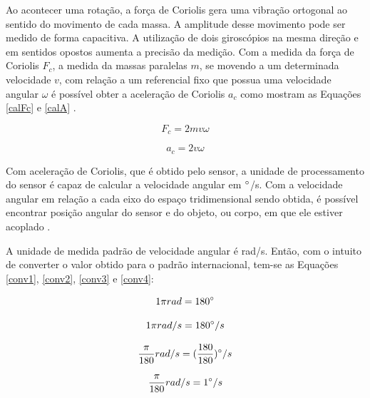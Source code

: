 			Ao acontecer uma rotação, a força de Coriolis gera uma vibração ortogonal ao sentido do movimento de cada massa. A amplitude desse movimento pode ser medido de forma capacitiva. A utilização de dois giroscópios na mesma direção e em sentidos opostos aumenta a precisão da medição. Com a medida da força de Coriolis  $F_{c}$, a medida da massas paralelas $m$, se movendo a um determinada velocidade $v$, com relação a um referencial fixo que possua uma velocidade angular $ \omega $ é possível obter a aceleração de Coriolis $a_{c}$ como mostram as Equações \ref{calFc} e \ref{calA} \cite{forhan2010}.
			
			\begin{equation}
			F_{c} = 2mv\omega
			\label{calFc}
			\end{equation}
			
			\begin{equation}
			a_{c} = 2v\omega
			\label{calA}
			\end{equation}
			
			Com aceleração de Coriolis, que é obtido pelo sensor, a unidade de processamento do sensor é capaz de calcular a velocidade angular em $\degree$/s. Com a velocidade angular em relação a cada eixo do espaço tridimensional sendo obtida, é possível encontrar posição angular do sensor e do objeto, ou corpo, em que ele estiver acoplado \cite{forhan2010}\cite{moyses2013}. 
			
			A unidade de medida padrão de velocidade angular  é rad/s. Então, com o intuito de converter o valor obtido para o padrão internacional, tem-se as Equações \ref{conv1}, \ref{conv2}, \ref{conv3} e \ref{conv4}:
			
			\begin{equation}
			1 \pi rad = 180\degree
			\label{conv1}
			\end{equation}
			
			\begin{equation}
			1 \pi rad /s = 180\degree/s 
			\label{conv2}
			\end{equation}
			
			\begin{equation}
			 \frac{\pi}{180} rad /s = (\frac{180}{180})\degree/s 
			\label{conv3}
			\end{equation}
			
			\begin{equation}
			\frac{\pi}{180} rad /s = 1\degree/s 
			\label{conv4}
			\end{equation}


